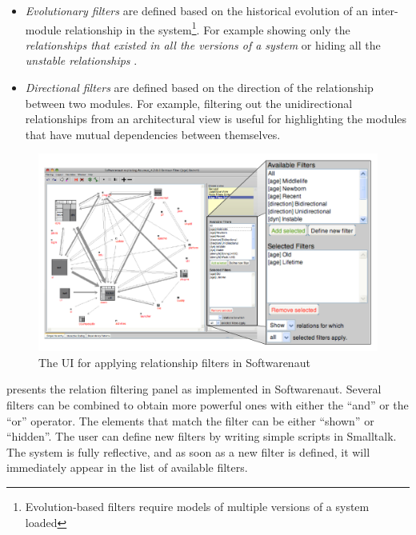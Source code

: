 \documentclass[preprint,12pt]{elsarticle}
\begin{document}
\begin{itemize}

\item {\em Evolutionary filters} are defined based on the historical evolution of an inter-module relationship in the system\footnote{Evolution-based filters require models of multiple versions of a system loaded}. For example showing only the {\em relationships that existed in all the versions of a system} or hiding all the {\em unstable relationships} \cite{lungu-relevo}.

\item {\em Directional filters} are defined based on the direction of the relationship between two modules. For example, filtering out the unidirectional relationships from an architectural view is useful for highlighting the modules that have mutual dependencies between themselves. 

\end{itemize}

\begin{figure}[ht]
\begin{center}
\includegraphics[width=\linewidth]{SnautFilteringPanel}
\caption{The UI for applying relationship filters in Softwarenaut}
\end{center}
\end{figure}

 presents the relation filtering panel as implemented in Softwarenaut. Several filters can be combined to obtain more powerful ones with either the ``and'' or the ``or'' operator. The elements that match the filter can be either ``shown'' or ``hidden''. The user can define new filters by writing simple scripts in Smalltalk. The system is fully reflective, and as soon as a new filter is defined, it will immediately appear in the list of available filters.
\end{document}

